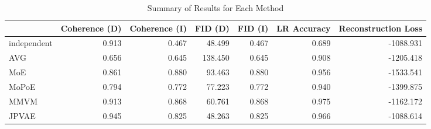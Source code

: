 \begin{table}
\caption{Summary of Results for Each Method}
\label{tab:summary_results}
\begin{tabular}{lrrrrrr}
\toprule
 & Coherence (D) & Coherence (I) & FID (D) & FID (I) & LR Accuracy & Reconstruction Loss \\
\midrule
independent & 0.913 & 0.467 & 48.499 & 0.467 & 0.689 & -1088.931 \\
AVG & 0.656 & 0.645 & 138.450 & 0.645 & 0.908 & -1205.418 \\
MoE & 0.861 & 0.880 & 93.463 & 0.880 & 0.956 & -1533.541 \\
MoPoE & 0.794 & 0.772 & 77.223 & 0.772 & 0.940 & -1399.875 \\
MMVM & 0.913 & 0.868 & 60.761 & 0.868 & 0.975 & -1162.172 \\
JPVAE & 0.945 & 0.825 & 48.263 & 0.825 & 0.966 & -1088.614 \\
\bottomrule
\end{tabular}
\end{table}
